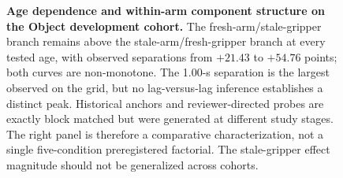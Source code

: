 \begin{figure}[t]
\centering
{}
\caption{\textbf{Age dependence and within-arm component structure on the
Object development cohort.} The fresh-arm/stale-gripper branch remains above
the stale-arm/fresh-gripper branch at every tested age, with observed
separations from $+21.43$ to $+54.76$ points; both curves are non-monotone.
The 1.00-s separation is the largest observed on the grid, but no
lag-versus-lag inference establishes a distinct peak. Historical anchors and
reviewer-directed probes are exactly block matched but were generated at
different study stages. The right panel is therefore a comparative
characterization, not a single five-condition preregistered factorial. The
stale-gripper effect magnitude should not be generalized across cohorts.}
\label{fig:development}
\end{figure}
